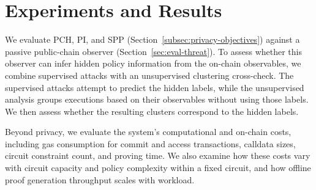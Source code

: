\section{Experiments and Results}
\label{sec:eval}

We evaluate PCH, PI, and SPP (Section~\ref{subsec:privacy-objectives}) against a passive public-chain observer (Section~\ref{sec:eval-threat}).
To assess whether this observer can infer hidden policy information from the on-chain observables, we combine supervised attacks with an unsupervised clustering cross-check.
The supervised attacks attempt to predict the hidden labels, while the unsupervised analysis groups executions based on their observables without using those labels.
We then assess whether the resulting clusters correspond to the hidden labels.


Beyond privacy, we evaluate the system's computational and on-chain costs, including gas consumption for commit and access transactions, calldata sizes, circuit constraint count, and proving time.
We also examine how these costs vary with circuit capacity and policy complexity within a fixed circuit, and how offline proof generation throughput scales with workload.

% 














